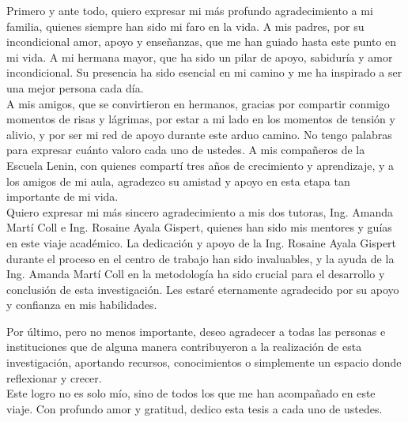 \documentclass[
	spanish, %
	letterpaper, oneside
]{book}
\begin{document}
\begin{acknowledgments}
	Primero y ante todo, quiero expresar mi más profundo agradecimiento a mi familia, quienes siempre han sido mi faro en la vida. A mis padres, por su incondicional amor, apoyo y enseñanzas, que me han guiado hasta este punto en mi vida. A mi hermana mayor, que ha sido un pilar de apoyo, sabiduría y amor incondicional. Su presencia ha sido esencial en mi camino y me ha inspirado a ser una mejor persona cada día.\\

A mis amigos, que se convirtieron en hermanos, gracias por compartir conmigo momentos de risas y lágrimas, por estar a mi lado en los momentos de tensión y alivio, y por ser mi red de apoyo durante este arduo camino. No tengo palabras para expresar cuánto valoro cada uno de ustedes. A mis compañeros de la Escuela Lenin, con quienes compartí tres años de crecimiento y aprendizaje, y a los amigos de mi aula, agradezco su amistad y apoyo en esta etapa tan importante de mi vida.\\

Quiero expresar mi más sincero agradecimiento a mis dos tutoras, Ing. Amanda Martí Coll e Ing. Rosaine Ayala Gispert, quienes han sido mis mentores y guías en este viaje académico. La dedicación y apoyo de la Ing. Rosaine Ayala Gispert durante el proceso en el centro de trabajo han sido invaluables, y la ayuda de la Ing. Amanda Martí Coll en la metodología ha sido crucial para el desarrollo y conclusión de esta investigación. Les estaré eternamente agradecido por su apoyo y confianza en mis habilidades.\

Por último, pero no menos importante, deseo agradecer a todas las personas e instituciones que de alguna manera contribuyeron a la realización de esta investigación, aportando recursos, conocimientos o simplemente un espacio donde reflexionar y crecer.\\

Este logro no es solo mío, sino de todos los que me han acompañado en este viaje. Con profundo amor y gratitud, dedico esta tesis a cada uno de ustedes.
\end{acknowledgments}

\templateIndex

\templateFinalcfg

\end{document}
